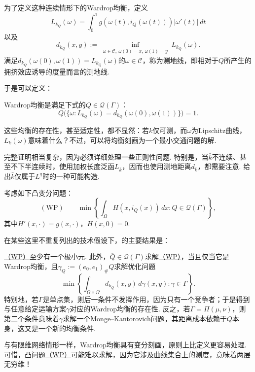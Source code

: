 为了定义这种连续情形下的Wardrop均衡，定义
\[
L_{k_Q}(\omega)=\int_0^1g(\omega(t),i_Q(\omega(t)))|\omega'(t)|\,dt
\]
以及
\[
d_{k_Q}(x,y):=\inf_{\substack{\omega\in\mathscr C,\ \omega(0)=x,\ \omega(1)=y}}L_{k_Q}(\omega).
\]
满足$d_{k_Q}(\omega(0),\omega(1))=L_{k_Q}(\omega)$的$\omega\in\mathscr C$，称为测地线，即相对于$Q$所产生的拥挤效应诱导的度量而言的测地线.

于是可以定义：
\begin{definition}\label{obj:4.31}
Wardrop均衡是满足下式的$Q\in\mathscr Q(\Gamma)$：
\begin{equation}\label{eq:4.20}
Q\bigl(\{\omega:L_{k_Q}(\omega)=d_{k_Q}(\omega(0),\omega(1))\}\bigr)=1.
\end{equation}
\end{definition}
这些均衡的存在性，甚至适定性，都不显然：若$k$仅可测，而$\omega$为Lipschitz曲线，$L_k(\omega)$意味着什么？不过，可以将均衡刻画为一个最小交通问题的解.

完整证明相当复杂，因为必须详细处理一些正则性问题. 特别是，当$\bar k$不连续、甚至不下半连续时，使用加权长度泛函$L_{\bar k}$，因而也使用测地距离$d_{\bar k}$，都需要注意. \cite{b112}给出$\bar k$仅属于$L^q$时的一种可能构造.

\begin{problem}\label{obj:4.32}
考虑如下凸变分问题：
\begin{equation}\label{eq:4.21}
(\mathrm{WP})\qquad
\min\left\{\int_\Omega H(x,i_Q(x))\,dx:Q\in\mathscr Q(\Gamma)\right\},
\end{equation}
其中$H'(x,\cdot)=g(x,\cdot)$，$H(x,0)=0$.
\end{problem}
在某些这里不重复列出的技术假设下，\cite{b112}的主要结果是：
\begin{theorem}\label{obj:4.33}
\hyperref[eq:4.21]{（WP）}至少有一个极小元. 此外，$\overline Q\in\mathscr Q(\Gamma)$求解\hyperref[eq:4.21]{（WP）}，当且仅当它是Wardrop均衡，且$\gamma_Q:=(e_0,e_1)_\#Q$求解优化问题
\[
\min\left\{\int_{\Omega\times\Omega}d_{k_Q}(x,y)\,d\gamma(x,y):\gamma\in\Gamma\right\}.
\]
特别地，若$\Gamma$是单点集，则后一条件不发挥作用，因为只有一个竞争者；于是得到与任意给定运输方案$\gamma$对应的Wardrop均衡的存在性. 反之，若$\Gamma=\Pi(\mu,\nu)$，则第二个条件意味着$\gamma$求解一个Monge--Kantorovich问题，其距离成本依赖于$Q$本身，这又是一个新的均衡条件.
\end{theorem}

与有限维网络情形一样，Wardrop均衡具有变分刻画，原则上比定义更容易处理. 可惜，凸问题\hyperref[eq:4.21]{（WP）}可能难以求解，因为它涉及曲线集合上的测度，意味着两层无穷维！

